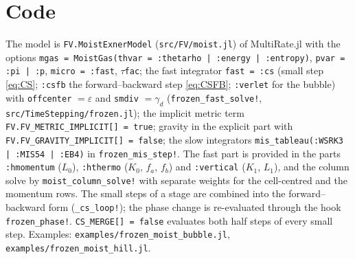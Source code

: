\documentclass[11pt,a4paper]{article}
\newcommand{\code}[1]{\texttt{\small #1}}
\begin{document}
\section{Code}
The model is \code{FV.MoistExnerModel} (\code{src/FV/moist.jl}) of MultiRate.jl with the options
\code{mgas = MoistGas(thvar = :thetarho | :energy | :entropy)}, \code{pvar = :pi | :p}, \code{micro = :fast}, \code{$\tau$fac};
the fast integrator \code{fast = :cs} (small step \eqref{eq:CS}; \code{:csfb} the forward--backward step \eqref{eq:CSFB};
\code{:verlet} for the bubble) with \code{offcenter} $=\varepsilon$ and \code{smdiv} $=\gamma_d$
(\code{frozen\_fast\_solve!}, \code{src/TimeStepping/frozen.jl}); the implicit metric term
\code{FV.FV\_METRIC\_IMPLICIT[] = true}; gravity in the explicit part with \code{FV.FV\_GRAVITY\_IMPLICIT[] = false}; the slow integrators \code{mis\_tableau(:WSRK3 | :MIS54 | :EB4)} in
\code{frozen\_mis\_step!}. The fast part is provided in the parts \code{:hmomentum} ($L_0$), \code{:hthermo}
($K_0$, $f_a$, $f_b$) and \code{:vertical} ($K_1$, $L_1$), and the column solve by \code{moist\_column\_solve!} with
separate weights for the cell-centred and the momentum rows. The small steps of a stage are combined into the
forward--backward form (\code{\_cs\_loop!}); the phase change is re-evaluated through the hook \code{frozen\_phase!}.
\code{CS\_MERGE[] = false} evaluates both half steps of every small step. Examples:
\code{examples/frozen\_moist\_bubble.jl}, \code{examples/frozen\_moist\_hill.jl}.
\end{document}
